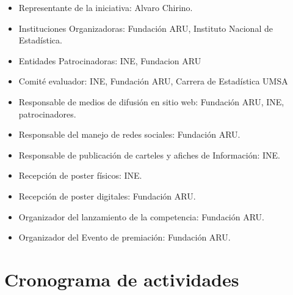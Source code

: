 \documentclass{article}
\begin{document}
\begin{itemize}
\item Representante de la iniciativa: Alvaro Chirino.  
\item Instituciones Organizadoras: Fundación ARU, Instituto Nacional de Estadística.
\item Entidades Patrocinadoras: INE, Fundacion ARU
\item Comité evaluador: INE, Fundación ARU, Carrera de Estadística UMSA
\item Responsable de medios de difusión en sitio web:  Fundación ARU, INE, patrocinadores. 
\item Responsable del manejo de redes sociales: Fundación ARU.
\item Responsable de publicación de carteles y afiches de Información: INE.
\item Recepción de poster físicos: INE.
\item Recepción de poster digitales: Fundación ARU.
\item Organizador del lanzamiento de la competencia: Fundación ARU.
\item Organizador del Evento de premiación: Fundación ARU.

\end{itemize}


\section{Cronograma de actividades}
\end{document}
